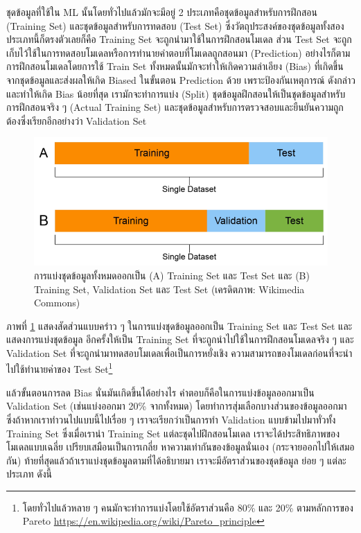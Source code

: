 ชุดข้อมูลที่ใช้ใน ML นั้นโดยทั่วไปแล้วมักจะมีอยู่ 2 ประเภทคือชุดข้อมูลสำหรับการฝึกสอน (Training Set) และชุดข้อมูลสำหรับการทดสอบ 
(Test Set) ซึ่งวัตถุประสงค์ของชุดข้อมูลทั้งสองประเภทนี้ก็ตรงตัวเลยก็คือ Training Set จะถูกนำมาใช้ในการฝึกสอนโมเดล ส่วน Test Set 
จะถูกเก็บไว้ใช้ในการทดสอบโมเดลหรือการทำนายคำตอบที่โมเดลถูกสอนมา (Prediction) อย่างไรก็ตาม การฝึกสอนโมเดลโดยการใช้ Train Set 
ทั้งหมดนั้นมักจะทำให้เกิดความลำเอียง (Bias) ที่เกิดขึ้นจากชุดข้อมูลและส่งผลให้เกิด Biased ในขั้นตอน Prediction ด้วย เพราะป้องกันเหตุการณ์%
ดังกล่าวและทำให้เกิด Bias น้อยที่สุด เรามักจะทำการแบ่ง (Split) ชุดข้อมูลฝึกสอนให้เป็นชุดข้อมูลสำหรับการฝึกสอนจริง ๆ (Actual Training 
Set) และชุดข้อมูลสำหรับการตรวจสอบและยืนยันความถูกต้องซึ่งเรียกอีกอย่างว่า Validation Set

\begin{figure}[H]
    \centering
    \includegraphics[width=0.8\linewidth]{fig/dataset.png}
    \caption{การแบ่งชุดข้อมูลทั้งหมดออกเป็น (A) Training Set และ Test Set และ (B) Training Set, Validation Set และ 
    Test Set (เครดิตภาพ: Wikimedia Commons)}
    \label{fig:dataset}
\end{figure}

ภาพที่ \ref{fig:dataset} แสดงสัดส่วนแบบคร่าว ๆ ในการแบ่งชุดข้อมูลออกเป็น Training Set และ Test Set และแสดงการแบ่งชุดข้อมูล%
อีกครั้งให้เป็น Training Set ที่จะถูกนำไปใช้ในการฝึกสอนโมเดลจริง ๆ และ Validation Set ที่จะถูกนำมาทดสอบโมเดลเพื่อเป็นการหยั่งเชิง%
ความสามารถของโมเดลก่อนที่จะนำไปใช้ทำนายค่าของ Test Set\footnote{โดยทั่วไปแล้วหลาย ๆ คนมักจะทำการแบ่งโดยใช้อัตราส่วนคือ 
80\% และ 20\% ตามหลักการของ Pareto \url{https://en.wikipedia.org/wiki/Pareto_principle}}

แล้วขั้นตอนการลด Bias นั่นมันเกิดขึ้นได้อย่างไร คำตอบก็คือในการแบ่งข้อมูลออกมาเป็น Validation Set (เช่นแบ่งออกมา 20\% จากทั้งหมด)
โดยทำการสุ่มเลือกบางส่วนของข้อมูลออกมา ซึ่งถ้าหากเราทำวนไปแบบนี้ไปเรื่อย ๆ เราจะเรียกว่าเป็นการทำ Validation แบบข้ามไปมาทั่วทั้ง 
Training Set ซึ่งเมื่อเรานำ Training Set แต่ละชุดไปฝึกสอนโมเดล เราจะได้ประสิทธิภาพของโมเดลแบบเฉลี่ย เปรียบเสมือนเป็นการเกลี่ย%
หาความเท่ากันของข้อมูลนั่นเอง (กระจายออกไปให้เสมอกัน) ท้ายที่สุดแล้วถ้าเราแบ่งชุดข้อมูลตามที่ได้อธิบายมา เราจะมีอัตราส่วนของชุดข้อมูล%
ย่อย ๆ แต่ละประเภท ดังนี้

